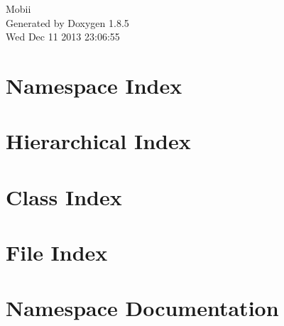 \documentclass[twoside]{book}
\newcommand{\clearemptydoublepage}{%
  \newpage{\pagestyle{empty}\cleardoublepage}%
}
\begin{document}
\hypersetup{pageanchor=false}
\begin{titlepage}
\vspace*{7cm}
\begin{center}%
{\Large Mobii }\\
\vspace*{1cm}
{\large Generated by Doxygen 1.8.5}\\
\vspace*{0.5cm}
{\small Wed Dec 11 2013 23:06:55}\\
\end{center}
\end{titlepage}
\clearemptydoublepage
\tableofcontents
\clearemptydoublepage
{}
\hypersetup{pageanchor=true}

\chapter{Namespace Index}

\chapter{Hierarchical Index}

\chapter{Class Index}

\chapter{File Index}

\chapter{Namespace Documentation}

\end{document}
